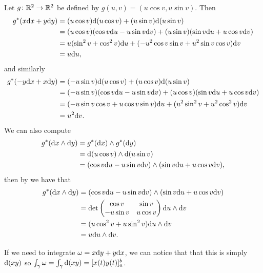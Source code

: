 \documentclass[11pt,a4paper]{article}
\begin{document}
\begin{example}
  Let $g \colon \mathbb{R}^2 \to \mathbb{R}^2$ be defined by
  $g(u,v) = (u \cos v, u \sin v)$.
  Then
  \begin{align*}
    g^*(x \dx + y \dy) &=
    (u \cos v) \dif(u \cos v) + (u \sin v) \dif(u \sin v) \\ &=
    (u \cos v) (\cos v \du - u \sin v \dv) +
    (u \sin v) (\sin v \du + u \cos v \dv) \\ &=
    u (\sin^2 v + \cos^2 v) \du + (-u^2 \cos v \sin v +  u^2 \sin v \cos v) \dv \\ &=
    u \du,
  \end{align*}
  and similarly
  \begin{align*}
    g^*(-y \dx + x \dy) &=
    (-u \sin v) \dif(u \cos v) + (u \cos v) \dif(u \sin v) \\ &=
    (-u \sin v) (\cos v \du - u \sin v \dv) + (u \cos v) (\sin v \du + u \cos v \dv) \\ &=
    (-u \sin v \cos v + u \cos v \sin v) \du + (u^2 \sin^2 v + u^2 \cos^2 v) \dv \\ &=
    u^2 \dv.
  \end{align*}
  We can also compute
  \begin{align*}
    g^*(\dx \wedge \dy) &=
    g^*(\dx) \wedge g^*(\dy) \\ &=
    \dif(u \cos v) \wedge \dif(u \sin v) \\ &=
    (\cos v \du - u \sin v \dv) \wedge (\sin v \du + u \cos v \dv),
  \end{align*}
  then by  we have that
  \begin{align*}
    g^*(\dx \wedge \dy) &=
    (\cos v \du - u \sin v \dv) \wedge (\sin v \du + u \cos v \dv) \\ &=
    \det
    \begin{pmatrix}
      \cos v & \sin v \\
      - u \sin v & u \cos v
    \end{pmatrix} \du \wedge \dv \\ &=
    (u \cos^2 v + u \sin^2 v) \du \wedge \dv \\ &=
    u \du \wedge \dv.
  \end{align*}

\end{example}

\begin{remark}
  If we need to integrate $\omega = x \dy + y \dx$,
  we can notice that that this is simply $\mathrm{d}(xy)$ so
  $\int_{\gamma} \omega = \int_{\gamma} \mathrm{d}(xy) = [x(t)y(t)]^{b}_{a}$.
\end{remark}
\end{document}
